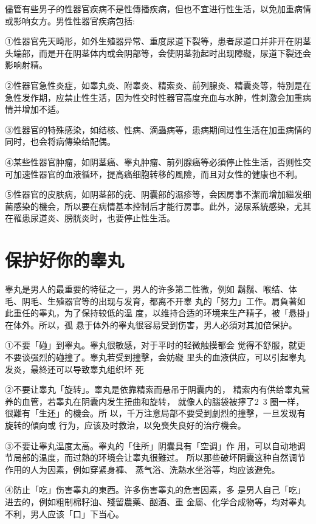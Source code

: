 \documentclass[12pt,UTF8]{ctexbook}
\begin{document}
儘管有些男子的性器官疾病不是性傳播疾病，但也不宜进行性生活，以免加重病情或影响女方。男性性器官疾病包括:

①性器官先天畸形，如外生殖器异常、重度尿道下裂等，患者尿道口并非开在阴茎头端部，而是开在阴茎体内或会阴部等，会使阴茎勃起时出现障礙，尿道下裂还会影响射精。

②性器官急性炎症，如睾丸炎、附睾炎、精索炎、前列腺炎、精囊炎等，特別是在急性发作期，应禁止性生活，因为性交时性器官高度充血与水肿，性刺激会加重病情并增加不适。

③性器官的特殊感染，如结核、性病、滴蟲病等，患病期间过性生活在加重病情的同时，也会将病傳染给配偶。

④某些性器官肿瘤，如阴茎癌、睾丸肿瘤、前列腺癌等必須停止性生活，否则性交可加速性器官的血液循环，提高癌细胞转移的風險，而且对女性的健康也不利。

⑤性器官的皮肤病，如阴茎部的疣、阴囊部的濕疹等，会因房事不潔而增加繼发细菌感染的機会，所以要在病情基本控制后才能行房事。此外，泌尿系統感染，尤其在罹患尿道炎、膀胱炎时，也要停止性生活。

\section{保护好你的睾丸}

睾丸是男人的最重要的特征之一，男人的许多第二性微，例如
鬍鬚、喉结、体毛、阴毛、生殖器官等的出现与发育，都离不开睾
丸的「努力」工作。肩負著如此重任的睾丸，为了保持较低的温
度，以维持合适的环境来生产精子，被「悬掛」在体外。所以，孤
悬于体外的睾丸很容易受到伤害，男人必須对其加倍保护。

①不要「碰」到睾丸。睾丸很敏感，对于平时的轻微触摸都会
觉得不舒服，就更不要谈强烈的碰撞了。睾丸若受到撞擊，会妨礙
里头的血液供应，可以引起睾丸发炎，最終还可以导致睾丸组织坏
死

②不要让睾丸「旋转」。睾丸是依靠精索而悬吊于阴囊内的，
精索内有供给睾丸营养的血管，若睾丸在阴囊内发生扭曲和旋转，
就像人的腦袋被擰了2~3 圈一样，很難有「生还」的機会。所
以，千万注意局部不要受到劇烈的撞擊，一旦发现有旋转的傾向或
行为，应该及时救治，以免喪失良好的治疗機会。

③不要让睾丸温度太高。睾丸的「住所」阴囊具有「空调」作
用，可以自动地调节局部的温度，而过熱的环境会让睾丸很難过。
所以那些破坏阴囊这种自然调节作用的人为因素，例如穿紧身褲、
蒸气浴、洗熱水坐浴等，均应该避免。

④防止「吃」伤害睾丸的東西。许多伤害睾丸的危害因素，多
是男人自己「吃」进去的，例如粗制棉籽油、殘留農藥、酗酒、重
金屬、化学合成物等，均对睾丸不利，男人应该「口」下当心。
\end{document}
